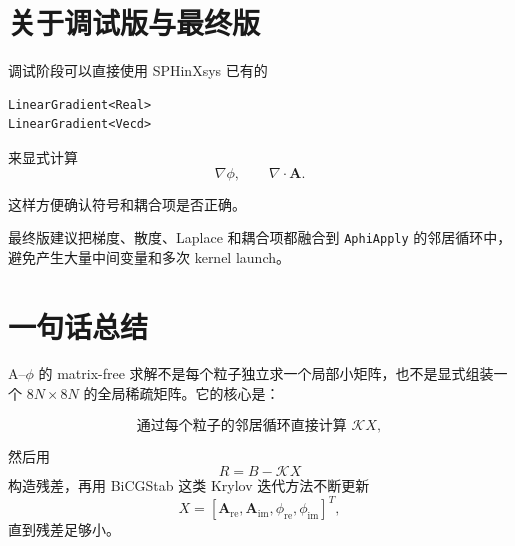 \documentclass[UTF8,11pt]{ctexart}
\begin{document}
\section{关于调试版与最终版}

调试阶段可以直接使用 SPHinXsys 已有的
\begin{lstlisting}
LinearGradient<Real>
LinearGradient<Vecd>
\end{lstlisting}
来显式计算
\begin{equation}
    \nabla\phi,
    \qquad
    \nabla\cdot\bm A.
\end{equation}

这样方便确认符号和耦合项是否正确。

最终版建议把梯度、散度、Laplace 和耦合项都融合到 \texttt{AphiApply} 的邻居循环中，避免产生大量中间变量和多次 kernel launch。

\section{一句话总结}

A--$\phi$ 的 matrix-free 求解不是每个粒子独立求一个局部小矩阵，也不是显式组装一个 $8N\times 8N$ 的全局稀疏矩阵。它的核心是：

\begin{equation}
    \text{通过每个粒子的邻居循环直接计算 } \mathcal{K}X,
\end{equation}

然后用
\begin{equation}
    R = B-\mathcal{K}X
\end{equation}
构造残差，再用 BiCGStab 这类 Krylov 迭代方法不断更新
\begin{equation}
    X =
    \left[
    \bm A_{\mathrm{re}},
    \bm A_{\mathrm{im}},
    \phi_{\mathrm{re}},
    \phi_{\mathrm{im}}
    \right]^T,
\end{equation}
直到残差足够小。
\end{document}
